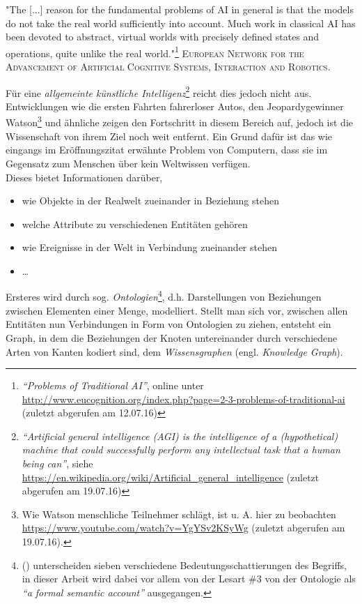 \newpage
\begin{itquote}
"The [...] reason for the fundamental problems of AI in general is that the models do
 not take the real world sufficiently into account. Much work in classical AI has been devoted to abstract, virtual
 worlds with precisely defined states and operations, quite unlike the real world."\footnote{\emph{``Problems of Traditional AI''},
 online unter \url{http://www.eucognition.org/index.php?page=2-3-problems-of-traditional-ai} (zuletzt abgerufen am 12.07.16)}
 \flushright
 \textsc{European Network for the Advancement of Artificial Cognitive Systems, Interaction
 and Robotics.}
\end{itquote}


Für eine \emph{allgemeinte künstliche Intelligenz}\footnote{\emph{``Artificial general intelligence (AGI) is the intelligence
of a (hypothetical) machine that could successfully perform any intellectual task that a human being can''}, siehe
\url{https://en.wikipedia.org/wiki/Artificial_general_intelligence} (zuletzt abgerufen am 19.07.16)} reicht dies jedoch nicht aus.
Entwicklungen wie die ersten Fahrten fahrerloser Autos, den Jeopardygewinner Watson\footnote{Wie Watson menschliche Teilnehmer
schlägt, ist u. A. hier zu beobachten \url{https://www.youtube.com/watch?v=YgYSv2KSyWg} (zuletzt abgerufen am 19.07.16).}
und ähnliche zeigen den Fortschritt in diesem Bereich auf, jedoch ist die Wissenschaft von ihrem Ziel noch weit entfernt.
Ein Grund dafür ist das wie eingangs im Eröffnungszitat erwähnte Problem von Computern, dass sie im Gegensatz zum
Menschen über kein Weltwissen verfügen.\\

Dieses bietet Informationen darüber,
\begin{itemize}
  \item wie Objekte in der Realwelt zueinander in Beziehung stehen
  \item welche Attribute zu verschiedenen Entitäten gehören
  \item wie Ereignisse in der Welt in Verbindung zueinander stehen
  \item \ldots
\end{itemize}

Ersteres wird durch sog. \emph{Ontologien}\footnote{(\cite{giaretta1995ontologies}) unterscheiden sieben verschiedene
Bedeutungsschattierungen des Begriffs, in dieser Arbeit wird dabei vor allem von der Lesart \#3 von der Ontologie als
\emph{``a formal semantic account''} ausgegangen.}, d.h. Darstellungen von Beziehungen zwischen Elementen einer Menge, modelliert.
Stellt man sich vor, zwischen allen Entitäten nun Verbindungen in Form von Ontologien zu ziehen, entsteht ein Graph,
in dem die Beziehungen der Knoten untereinander durch verschiedene Arten von Kanten kodiert sind, dem
\emph{Wissensgraphen} (engl. \emph{Knowledge Graph}).\\

